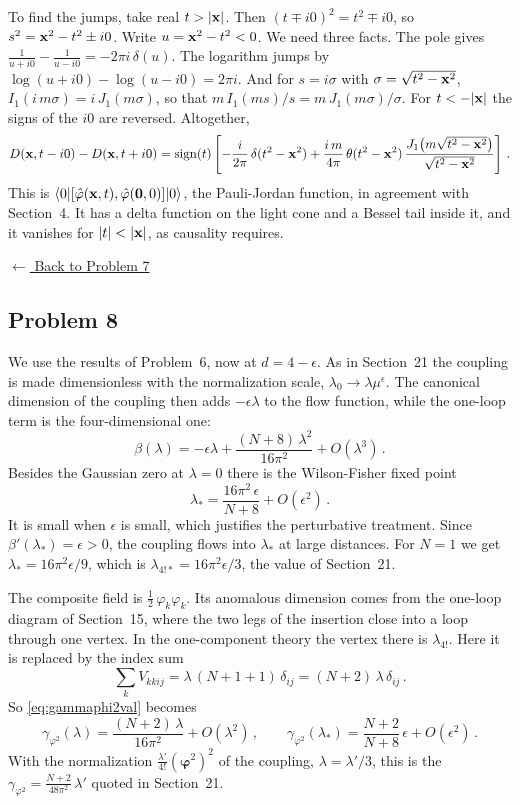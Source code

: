 To find the jumps, take real $t>|\mathbf{x}|$. Then $(t\mp i0)^2=t^2\mp i0$, so
$s^2=\mathbf{x}^2-t^2\pm i0$. Write $u=\mathbf{x}^2-t^2<0$. We need three facts. The pole
gives $\frac1{u+i0}-\frac1{u-i0}=-2\pi i\,\delta(u)$. The logarithm jumps by
$\log(u+i0)-\log(u-i0)=2\pi i$. And for $s=i\sigma$ with
$\sigma=\sqrt{t^2-\mathbf{x}^2}$, $I_1(i\,m\sigma)=i\,J_1(m\sigma)$, so that
$m\,I_1(ms)/s=m\,J_1(m\sigma)/\sigma$. For $t<-|\mathbf{x}|$ the signs of the $i0$ are
reversed. Altogether,
\[
D(\mathbf{x},t-i0)-D(\mathbf{x},t+i0)=\operatorname{sign}(t)\left[-\frac i{2\pi}\,\delta(t^2-\mathbf{x}^2)
+\frac{i\,m}{4\pi}\,\theta(t^2-\mathbf{x}^2)\,\frac{J_1\bigl(m\sqrt{t^2-\mathbf{x}^2}\bigr)}{\sqrt{t^2-\mathbf{x}^2}}\right]\,.
\]
This is $\langle 0|[\hat\varphi(\mathbf{x},t),\hat\varphi(\mathbf0,0)]|0\rangle$, the
Pauli-Jordan function, in agreement with Section~4. It has a delta function on
the light cone and a Bessel tail inside it, and it vanishes for $|t|<|\xx|$, as
causality requires.

\noindent\hyperref[hw:7]{$\leftarrow$ Back to Problem 7}

\subsection{Problem 8}\label{sol:8}

 We use the results of Problem~6, now at
$d=4-\epsilon$. As in Section~21 the coupling is made dimensionless with the
normalization scale, $\lambda_0\to\lambda\mu^\epsilon$. The canonical dimension
of the coupling then adds $-\epsilon\lambda$ to the flow function, while the
one-loop term is the four-dimensional one:
\[
\beta(\lambda)=-\epsilon\lambda+\frac{(N+8)\,\lambda^2}{16\pi^2}+O(\lambda^3)\,.
\]
Besides the Gaussian zero at $\lambda=0$ there is the Wilson-Fisher fixed point
\[
\lambda_*=\frac{16\pi^2\,\epsilon}{N+8}+O(\epsilon^2)\,.
\]
It is small when $\epsilon$ is small, which justifies the perturbative
treatment. Since $\beta'(\lambda_*)=\epsilon>0$, the coupling flows into
$\lambda_*$ at large distances. For $N=1$ we get $\lambda_*=16\pi^2\epsilon/9$,
which is $\lambda_{4!*}=16\pi^2\epsilon/3$, the value of Section~21.

 The composite field is
$\frac12\,\varphi_k\varphi_k$. Its anomalous dimension comes from the one-loop
diagram of Section~15, where the two legs of the insertion close into a loop
through one vertex. In the one-component theory the vertex there is
$\lambda_{4!}$. Here it is replaced by the index sum
\[
\sum_kV_{kkij}=\lambda\,(N+1+1)\,\delta_{ij}=(N+2)\,\lambda\,\delta_{ij}\,.
\]
So \eqref{eq:gammaphi2val} becomes
\[
\gamma_{\varphi^2}(\lambda)=\frac{(N+2)\,\lambda}{16\pi^2}+O(\lambda^2)\,,\qquad
\gamma_{\varphi^2}(\lambda_*)=\frac{N+2}{N+8}\,\epsilon+O(\epsilon^2)\,.
\]
With the normalization $\frac{\lambda'}{4!}(\bm{\varphi}^2)^2$ of the coupling,
$\lambda=\lambda'/3$, this is the
$\gamma_{\varphi^2}=\frac{N+2}{48\pi^2}\,\lambda'$ quoted in Section~21.


